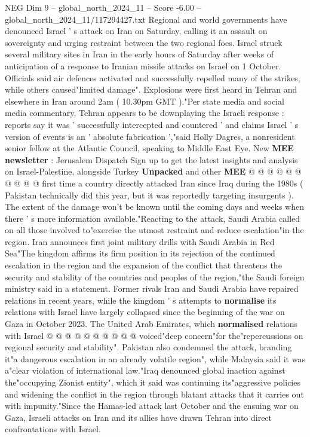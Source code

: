 \begin{textsample}{NEG Dim 9 – global\_north\_2024\_11 – Score -6.00 – global\_north\_2024\_11/117294427.txt}  \label{ex:f9_neg_049}
Regional and world governments have denounced Israel ' s attack on Iran on Saturday, calling it an assault on sovereignty and urging restraint between the two regional foes.
Israel struck several military sites in Iran in the early hours of Saturday after weeks of anticipation of a response to Iranian missile attacks on Israel on 1 October.
Officials said air defences activated and successfully repelled many of the strikes, while others caused"limited damage".
Explosions were first heard in Tehran and elsewhere in Iran around 2am ( 10.30pm GMT )."Per state media and social media commentary, Tehran appears to be downplaying the Israeli response : reports say it was ' successfully intercepted and countered ' and claims Israel ' s version of events is an ' absolute fabrication ',"said Holly Dagres, a nonresident senior fellow at the Atlantic Council, speaking to Middle East Eye.
New \textbf{MEE} \textbf{newsletter} : Jerusalem Dispatch Sign up to get the latest insights and analysis on Israel-Palestine, alongside Turkey \textbf{Unpacked} and other \textbf{MEE} @ @ @ @ @ @ @ @ @ @ first time a country directly attacked Iran since Iraq during the 1980s ( Pakistan technically did this year, but it was reportedly targeting insurgents ).
The extent of the damage won't be known until the coming days and weeks when there ' s more information available."Reacting to the attack, Saudi Arabia called on all those involved to"exercise the utmost restraint and reduce escalation"in the region.
Iran announces first joint military drills with Saudi Arabia in Red Sea"The kingdom affirms its firm position in its rejection of the continued escalation in the region and the expansion of the conflict that threatens the security and stability of the countries and peoples of the region,"the Saudi foreign ministry said in a statement.
Former rivals Iran and Saudi Arabia have repaired relations in recent years, while the kingdom ' s attempts to \textbf{normalise} its relations with Israel have largely collapsed since the beginning of the war on Gaza in October 2023.
The United Arab Emirates, which \textbf{normalised} relations with Israel @ @ @ @ @ @ @ @ @ @ voiced"deep concern"for the"repercussions on regional security and stability".
Pakistan also condemned the attack, branding it"a dangerous escalation in an already volatile region", while Malaysia said it was a"clear violation of international law."Iraq denounced global inaction against the"occupying Zionist entity", which it said was continuing its"aggressive policies and widening the conflict in the region through blatant attacks that it carries out with impunity."Since the Hamas-led attack last October and the ensuing war on Gaza, Israeli attacks on Iran and its allies have drawn Tehran into direct confrontations with Israel.

\end{textsample}
